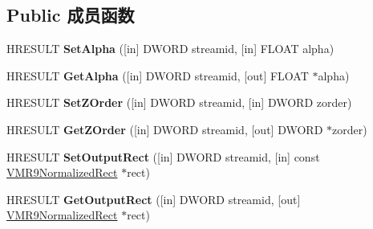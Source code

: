 \subsection*{Public 成员函数}
\begin{DoxyCompactItemize}
\item 
\mbox{\label{interface_i_v_m_r_mixer_control9_acf65e799b7433191b3233c10deae12e4}} 
H\+R\+E\+S\+U\+LT {\bfseries Set\+Alpha} (\mbox{[}in\mbox{]} D\+W\+O\+RD streamid, \mbox{[}in\mbox{]} F\+L\+O\+AT alpha)
\item 
\mbox{\label{interface_i_v_m_r_mixer_control9_aef21b7a1936e5fc2eb213fcc0537d3ce}} 
H\+R\+E\+S\+U\+LT {\bfseries Get\+Alpha} (\mbox{[}in\mbox{]} D\+W\+O\+RD streamid, \mbox{[}out\mbox{]} F\+L\+O\+AT $\ast$alpha)
\item 
\mbox{\label{interface_i_v_m_r_mixer_control9_a28bb4f985cc55f817f8fe51b71977316}} 
H\+R\+E\+S\+U\+LT {\bfseries Set\+Z\+Order} (\mbox{[}in\mbox{]} D\+W\+O\+RD streamid, \mbox{[}in\mbox{]} D\+W\+O\+RD zorder)
\item 
\mbox{\label{interface_i_v_m_r_mixer_control9_ad9fc0093b4b89c0ba5aecc00c71d9a85}} 
H\+R\+E\+S\+U\+LT {\bfseries Get\+Z\+Order} (\mbox{[}in\mbox{]} D\+W\+O\+RD streamid, \mbox{[}out\mbox{]} D\+W\+O\+RD $\ast$zorder)
\item 
\mbox{\label{interface_i_v_m_r_mixer_control9_abeaa0150290e2fd17ca7ef8dd8832a09}} 
H\+R\+E\+S\+U\+LT {\bfseries Set\+Output\+Rect} (\mbox{[}in\mbox{]} D\+W\+O\+RD streamid, \mbox{[}in\mbox{]} const \hyperlink{struct___v_m_r9_normalized_rect}{V\+M\+R9\+Normalized\+Rect} $\ast$rect)
\item 
\mbox{\label{interface_i_v_m_r_mixer_control9_aec91c05c44df129bb44e54585bd787e3}} 
H\+R\+E\+S\+U\+LT {\bfseries Get\+Output\+Rect} (\mbox{[}in\mbox{]} D\+W\+O\+RD streamid, \mbox{[}out\mbox{]} \hyperlink{struct___v_m_r9_normalized_rect}{V\+M\+R9\+Normalized\+Rect} $\ast$rect)
\item 
\mbox{\label{interface_i_v_m_r_mixer_control9_a465914ffeeb268877e133a3167e54103}} 

\end{DoxyCompactItemize}
